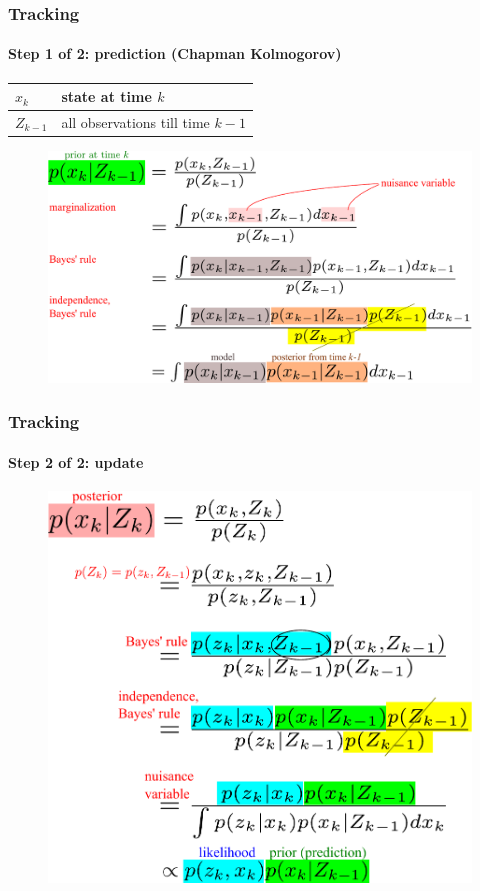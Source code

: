 \begin{frame}
\frametitle{Tracking}
\framesubtitle{Step 1 of 2: prediction (Chapman Kolmogorov)}
\mypagenum
\begin{table}
\begin{tabular}{|l|l|}\hline
$x_k$ & state at time $k$\\\hline
$Z_{k-1}$ &  all observations till time $k-1$\\\hline
\end{tabular}
\end{table}
\begin{figure}
\includegraphics[width=1.0\textwidth]{thesis/TRK_EQN_prediction.pdf}
\end{figure}
\end{frame}


\begin{frame}
\frametitle{Tracking}
\framesubtitle{Step 2 of 2: update}
\mypagenum
\begin{figure}
\includegraphics[height=0.8\textheight]{thesis/TRK_EQN_update.pdf}
\end{figure}
\end{frame}

